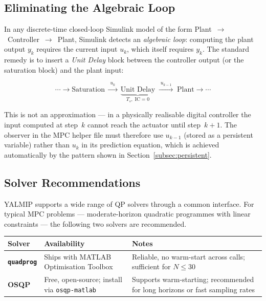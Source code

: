 \subsection{Eliminating the Algebraic Loop}
\label{subsec:algloop_general}

In any discrete-time closed-loop Simulink model of the form
Plant~$\to$~Controller~$\to$~Plant, Simulink detects an
\emph{algebraic loop}: computing the plant output $y_k$ requires
the current input $u_k$, which itself requires $y_k$.  The standard
remedy is to insert a \emph{Unit Delay} block between the controller
output (or the saturation block) and the plant input:

\[
\cdots \to \text{Saturation} \;\xrightarrow{\;u_k\;}\;
\underbrace{\text{Unit Delay}}_{T_s,\;\mathrm{IC}=0}
\;\xrightarrow{\;u_{k-1}\;}\; \text{Plant} \to \cdots
\]

This is not an approximation — in a physically realisable digital
controller the input computed at step~$k$ cannot reach the actuator
until step~$k{+}1$.  The observer in the MPC helper file must
therefore use $u_{k-1}$ (stored as a persistent variable) rather than
$u_k$ in its prediction equation, which is achieved automatically by
the pattern shown in Section~\ref{subsec:persistent}.

\subsection{Solver Recommendations}
\label{subsec:solvers}

YALMIP supports a wide range of QP solvers through a common interface.
For typical MPC problems — moderate-horizon quadratic programmes with
linear constraints — the following two solvers are recommended.

\begin{center}
	\begin{tabular}{>{\bfseries\sffamily}l p{4.2cm} p{5.6cm}}
		\toprule
		Solver & Availability & Notes \\
		\midrule
		\texttt{quadprog} &
		Ships with MATLAB Optimisation Toolbox &
		Reliable, no warm-start across calls; sufficient for $N \leq 30$ \\[4pt]
		OSQP &
		Free, open-source; install via \texttt{osqp-matlab} &
		Supports warm-starting; recommended for long horizons or fast
		sampling rates \\
		\bottomrule
	\end{tabular}
\end{center}

